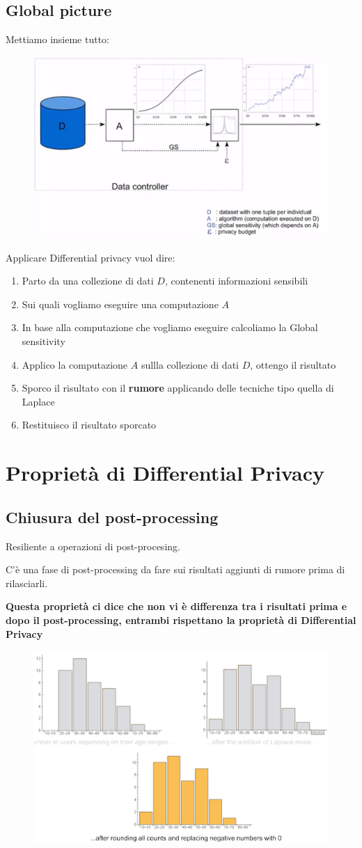 \documentclass{report}
\begin{document}
\section{Global picture}
Mettiamo insieme tutto:
\begin{figure}[H]
        \centering
        \includegraphics[width=0.6\linewidth]{images/slideextra.png}
    \end{figure}
\noindent Applicare Differential privacy vuol dire:
\begin{enumerate}
    \item Parto da una collezione di dati $D$, contenenti informazioni sensibili
    \item Sui quali vogliamo eseguire una computazione $A$
    \item In base alla computazione che vogliamo eseguire calcoliamo la Global sensitivity
    \item Applico la computazione $A$ sullla collezione di dati $D$, ottengo il risultato
    \item Sporco il risultato con il \textbf{rumore} applicando delle tecniche tipo quella di Laplace
    \item Restituisco il  risultato sporcato
\end{enumerate}

\chapter{Proprietà di Differential Privacy}
\section{Chiusura del post-processing}
Resiliente a operazioni di post-procesing.

\noindent C'è una fase di post-processing da fare sui risultati aggiunti di rumore prima di rilasciarli.

\noindent \textbf{Questa proprietà ci dice che non vi è differenza tra i risultati prima e dopo il post-processing,
entrambi rispettano la proprietà di Differential Privacy}
\begin{figure}[H]
        \centering
        \includegraphics[width=0.4\linewidth]{images/postP.png}
\end{figure}
\end{document}
